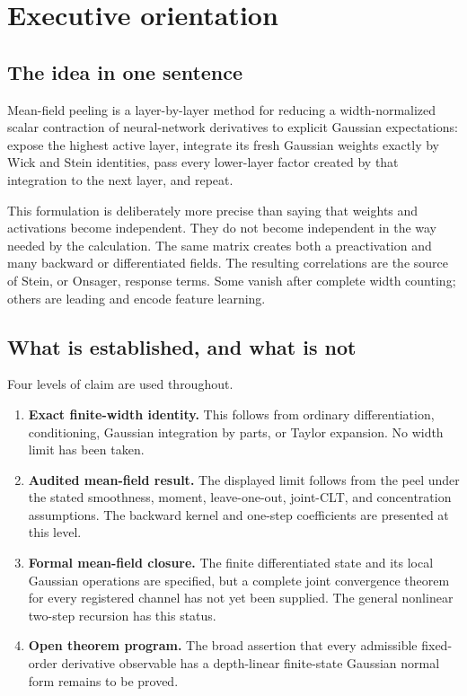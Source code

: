 \section*{Executive orientation}


\subsection*{The idea in one sentence}


Mean-field peeling is a layer-by-layer method for reducing a width-normalized
scalar contraction of neural-network derivatives to explicit Gaussian
expectations: expose the highest active layer, integrate its fresh Gaussian
weights exactly by Wick and Stein identities, pass every lower-layer factor
created by that integration to the next layer, and repeat.

This formulation is deliberately more precise than saying that weights and
activations become independent. They do not become independent in the way
needed by the calculation. The same matrix creates both a preactivation and
many backward or differentiated fields. The resulting correlations are the
source of Stein, or Onsager, response terms. Some vanish after complete width
counting; others are leading and encode feature learning.

\subsection*{What is established, and what is not}


Four levels of claim are used throughout.

\begin{enumerate}
\item \textbf{Exact finite-width identity.} This follows from ordinary differentiation,
   conditioning, Gaussian integration by parts, or Taylor expansion. No width
   limit has been taken.
\item \textbf{Audited mean-field result.} The displayed limit follows from the peel
   under the stated smoothness, moment, leave-one-out, joint-CLT, and
   concentration assumptions. The backward kernel and one-step coefficients
   are presented at this level.
\item \textbf{Formal mean-field closure.} The finite differentiated state and its local
   Gaussian operations are specified, but a complete joint convergence theorem
   for every registered channel has not yet been supplied. The general
   nonlinear two-step recursion has this status.
\item \textbf{Open theorem program.} The broad assertion that every admissible
   fixed-order derivative observable has a depth-linear finite-state Gaussian
   normal form remains to be proved.
\end{enumerate}


